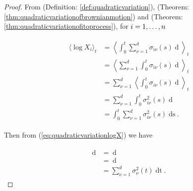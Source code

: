 \documentclass[british]{amsart}
\numberwithin{equation}{section}
\numberwithin{figure}{section}
\theoremstyle{plain}
\theoremstyle{definition}
\theoremstyle{plain}
\theoremstyle{plain}
\theoremstyle{plain}
\theoremstyle{remark}
\theoremstyle{plain}
\renewcommand{\d}[1]{\mathop{\mathrm{d}{#1}}}
\begin{document}
\begin{proof} 

	From (Definition: \ref{def:quadraticvariation}), (Theorem: 
	\ref{thm:quadraticvariationofbrownianmotion}) and (Theorem: 
	\ref{thm:quadraticvariationofitoprocess}), for $i=1,\dots,n$

	\begin{gather}
		\begin{split} 
			\label{eq:quadraticvariationlogX}
			\langle \log{X_{i}} \rangle_{t} 
			 & = \left< \int_{0}^{t} \sum_{\nu=1}^{d} \sigma_{i\nu}(s) \d{W_{\nu}(s)} \right>_{t} \\
			 & = \left< \sum_{\nu=1}^{d} \int_{0}^{t} \sigma_{i\nu}(s) \d{W_{\nu}(s)} \right>_{t} \\
			 & = \sum_{\nu=1}^{d} \left< \int_{0}^{t} \sigma_{i\nu}(s) \d{W_{\nu}(s)} \right>_{t} \\
			 & = \sum_{\nu=1}^{d} \int_{0}^{t} \sigma_{i\nu}^{2}(s) \d{\langle W_{\nu}(s) \rangle } \\
			 & = \int_{0}^{t} \sum_{\nu=1}^{d} \sigma_{i\nu}^{2}(s) \d{s}.
		\end{split}
	\end{gather}
	
	Then from (\ref{eq:quadraticvariationlogX}) we have
	
	\begin{gather}
		\begin{split}
			\d{\langle \log{X} \rangle_{t}}
				& = \d{\left<\int_{0}^{t} \sum_{\nu=1}^{d} \sigma_{\nu}(s) \d{W_{\nu}(s)}\right>_{t}}\\
				& = \d{\left(\int_{0}^{t} \sum_{\nu=1}^{d} \sigma_{\nu}^{2}(s) \d{s}\right)} \\
				& = \sum_{\nu=1}^{d} \sigma_{\nu}^{2}(t) \d{t}.
		\end{split}
	\end{gather}

\end{proof}
\end{document}
